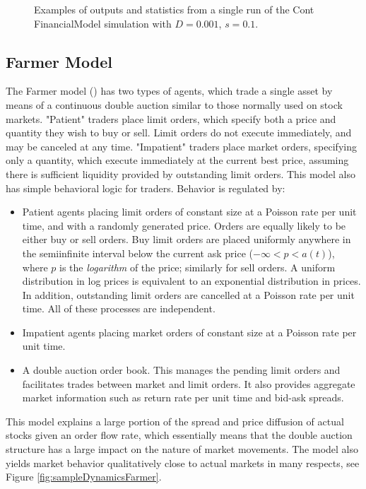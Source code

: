 \documentclass[runningheads]{llncs}
\begin{document}
\begin{figure}[htbp]
\begin{center}
{      }
    \caption{Examples of outputs and statistics from a single run of the Cont FinancialModel simulation with $D=0.001$, $s=0.1$.}
    \label{fig:ContLargeSSim}
  \end{center}
\end{figure}


\subsection{Farmer Model}

The Farmer model (\cite{farmer2003}) has two types of agents, which trade a single asset by means of a continuous double auction similar to those normally used on stock markets. "Patient" traders place limit orders, which specify both a price and quantity they wish to buy or sell. Limit orders do not execute immediately, and may be canceled at any time. "Impatient" traders place market orders, specifying only a quantity, which execute immediately at the current best price, assuming there is sufficient liquidity provided by outstanding limit orders. This model also has simple behavioral logic for traders. Behavior is regulated by:
\begin{itemize}
\item Patient agents placing limit orders of constant size at a Poisson rate per unit time, and with a randomly generated price. Orders are equally likely to be either buy or sell orders. Buy limit orders are placed uniformly anywhere in the semiinfinite interval below the current ask price ($-\infty < p < a(t)$), where $p$ is the \emph{logarithm} of the price; similarly for sell orders. A uniform distribution in log prices is equivalent to an exponential distribution in prices. In addition, outstanding limit orders are cancelled at a Poisson rate per unit time. All of these processes are independent.
\item Impatient agents placing market orders of constant size at a Poisson rate per unit time.
\item A double auction order book. This manages the pending limit orders and facilitates trades between market and limit orders. It also provides aggregate market information such as return rate per unit time and bid-ask spreads.
\end{itemize}
This model explains a large portion of the spread and price diffusion of actual stocks given an order flow rate, which essentially means that the double auction structure has a large impact on the nature of market movements. The model also yields market behavior qualitatively close to actual markets in many respects, see Figure \ref{fig:sampleDynamicsFarmer}.
\end{document}
